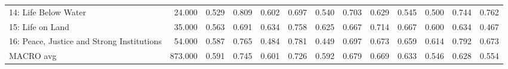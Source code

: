 \begin{tabular}{lrrrrrrrrrrrr}
14: Life Below Water & 24.000 & 0.529 & 0.809 & 0.602 & 0.697 & 0.540 & 0.703 & 0.629 & 0.545 & 0.500 & 0.744 & 0.762 \\
15: Life on Land & 35.000 & 0.563 & 0.691 & 0.634 & 0.758 & 0.625 & 0.667 & 0.714 & 0.667 & 0.600 & 0.634 & 0.467 \\
16: Peace, Justice and Strong Institutions & 54.000 & 0.587 & 0.765 & 0.484 & 0.781 & 0.449 & 0.697 & 0.673 & 0.659 & 0.614 & 0.792 & 0.673 \\
MACRO avg & 873.000 & 0.591 & 0.745 & 0.601 & 0.726 & 0.592 & 0.679 & 0.669 & 0.633 & 0.546 & 0.628 & 0.554 \\
\bottomrule
\end{tabular}
